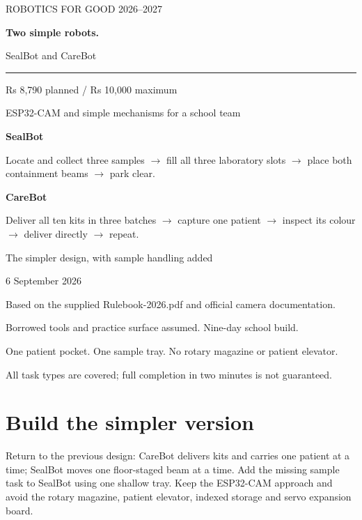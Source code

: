 \documentclass[10pt,a4paper]{article}
\begin{document}
\hypersetup{pageanchor=false}
\begin{titlepage}
\color{ink}
\vspace*{20mm}
{\large ROBOTICS FOR GOOD 2026--2027\par}
\vspace{9mm}
{\Huge\bfseries Two simple robots.\par}
\vspace{7mm}
{\Large SealBot and CareBot\par}
\vspace{12mm}
\rule{\linewidth}{1pt}
\vspace{8mm}
{\large Rs 8,790 planned / Rs 10,000 maximum\par}
{\large ESP32-CAM and simple mechanisms for a school team\par}
\vspace{12mm}
\textbf{SealBot}\par
Locate and collect three samples $\rightarrow$ fill all three laboratory slots
$\rightarrow$ place both containment beams $\rightarrow$ park clear.\par
\vspace{6mm}
\textbf{CareBot}\par
Deliver all ten kits in three batches $\rightarrow$ capture one patient
$\rightarrow$ inspect its colour $\rightarrow$ deliver directly $\rightarrow$ repeat.\par
\vfill
\color{black}
The simpler design, with sample handling added\par
6 September 2026\par
Based on the supplied Rulebook-2026.pdf and official camera documentation.\par
Borrowed tools and practice surface assumed. Nine-day school build.\par
One patient pocket. One sample tray. No rotary magazine or patient elevator.\par
All task types are covered; full completion in two minutes is not guaranteed.
\end{titlepage}
\hypersetup{pageanchor=true}
\tableofcontents
\clearpage
{}
\section{Build the simpler version}
Return to the previous design: CareBot delivers kits and carries one patient at a time; SealBot moves one floor-staged beam at a time. Add the missing sample task to SealBot using one shallow tray. Keep the ESP32-CAM approach and avoid the rotary magazine, patient elevator, indexed storage and servo expansion board.
\end{document}
